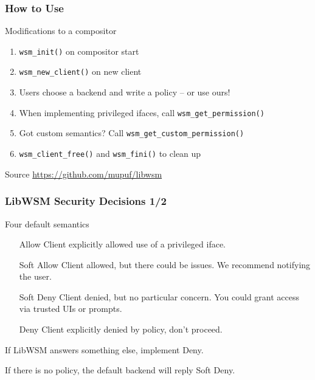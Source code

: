 \begin{frame}
\frametitle{How to Use}

	\begin{block}{Modifications to a compositor}
	\begin{enumerate}
	\item \texttt{wsm\_init()} on compositor start
	\item \texttt{wsm\_new\_client()} on new client	
	\item Users choose a backend and write a policy -- or use ours!
	\item When implementing privileged ifaces, call \texttt{wsm\_get\_permission()}
	\item Got custom semantics? Call \texttt{wsm\_get\_custom\_permission()}
	\item \texttt{wsm\_client\_free()} and \texttt{wsm\_fini()} to clean up
	\end{enumerate}
	\end{block}

	\begin{block}{Source}
		\url{https://github.com/mupuf/libwsm}
	\end{block}

\end{frame}

\begin{frame}
\frametitle{LibWSM Security Decisions 1/2}

	\begin{block}{Four default semantics}
	\begin{enumerate}[leftmargin=1em]
	\item[Allow] Client explicitly allowed use of a privileged iface.
	\item[Soft Allow] Client allowed, but there could be issues. We recommend notifying the user.
	\item[Soft Deny] Client denied, but no particular concern. You could grant access via trusted UIs or prompts. 
	\item[Deny] Client explicitly denied by policy, don't proceed.
	\end{enumerate}
	\end{block}

	If LibWSM answers something else, implement {\color{xorg-palette-light}Deny}.
	
	If there is no policy, the default backend will reply {\color{xorg-palette-light}Soft Deny}.
\end{frame}

